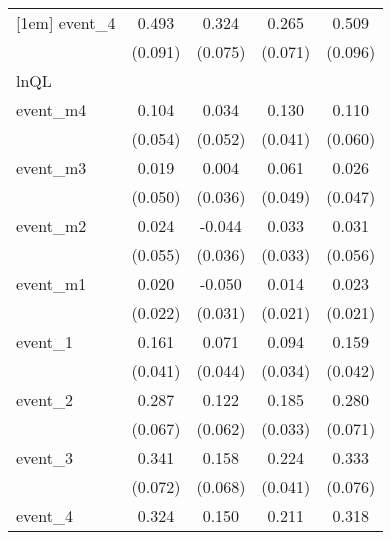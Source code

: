 \begin{table}[htbp]
\begin{tabular}{l*{4}{c}}
[1em]
event\_4     &       0.493\sym{***}&       0.324\sym{***}&       0.265\sym{***}&       0.509\sym{***}\\
            &     (0.091)         &     (0.075)         &     (0.071)         &     (0.096)         \\
\hline
lnQL        &                     &                     &                     &                     \\
event\_m4    &       0.104         &       0.034         &       0.130\sym{**} &       0.110         \\
            &     (0.054)         &     (0.052)         &     (0.041)         &     (0.060)         \\
[1em]
event\_m3    &       0.019         &       0.004         &       0.061         &       0.026         \\
            &     (0.050)         &     (0.036)         &     (0.049)         &     (0.047)         \\
[1em]
event\_m2    &       0.024         &      -0.044         &       0.033         &       0.031         \\
            &     (0.055)         &     (0.036)         &     (0.033)         &     (0.056)         \\
[1em]
event\_m1    &       0.020         &      -0.050         &       0.014         &       0.023         \\
            &     (0.022)         &     (0.031)         &     (0.021)         &     (0.021)         \\
[1em]
event\_1     &       0.161\sym{***}&       0.071         &       0.094\sym{**} &       0.159\sym{***}\\
            &     (0.041)         &     (0.044)         &     (0.034)         &     (0.042)         \\
[1em]
event\_2     &       0.287\sym{***}&       0.122\sym{*}  &       0.185\sym{***}&       0.280\sym{***}\\
            &     (0.067)         &     (0.062)         &     (0.033)         &     (0.071)         \\
[1em]
event\_3     &       0.341\sym{***}&       0.158\sym{*}  &       0.224\sym{***}&       0.333\sym{***}\\
            &     (0.072)         &     (0.068)         &     (0.041)         &     (0.076)         \\
[1em]
event\_4     &       0.324\sym{***}&       0.150\sym{**} &       0.211\sym{***}&       0.318\sym{***}\\

\end{tabular}
\end{table}
